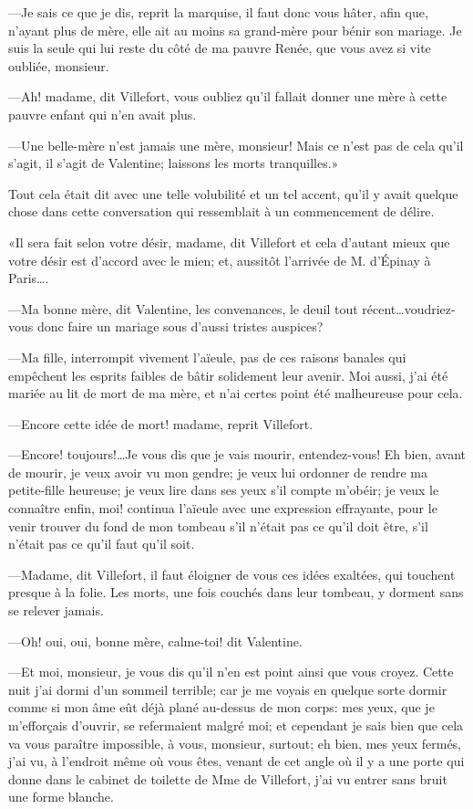 —Je sais ce que je dis, reprit la marquise, il faut donc vous hâter, afin que, n'ayant plus de mère, elle ait au moins sa grand-mère pour bénir son mariage. Je suis la seule qui lui reste du côté de ma pauvre Renée, que vous avez si vite oubliée, monsieur. 

—Ah! madame, dit Villefort, vous oubliez qu'il fallait donner une mère à cette pauvre enfant qui n'en avait plus. 

—Une belle-mère n'est jamais une mère, monsieur! Mais ce n'est pas de cela qu'il s'agit, il s'agit de Valentine; laissons les morts tranquilles.» 

Tout cela était dit avec une telle volubilité et un tel accent, qu'il y avait quelque chose dans cette conversation qui ressemblait à un commencement de délire. 

«Il sera fait selon votre désir, madame, dit Villefort et cela d'autant mieux que votre désir est d'accord avec le mien; et, aussitôt l'arrivée de M. d'Épinay à Paris\dots. 

—Ma bonne mère, dit Valentine, les convenances, le deuil tout récent\dots voudriez-vous donc faire un mariage sous d'aussi tristes auspices? 

—Ma fille, interrompit vivement l'aïeule, pas de ces raisons banales qui empêchent les esprits faibles de bâtir solidement leur avenir. Moi aussi, j'ai été mariée au lit de mort de ma mère, et n'ai certes point été malheureuse pour cela. 

—Encore cette idée de mort! madame, reprit Villefort. 

—Encore! toujours!\dots Je vous dis que je vais mourir, entendez-vous! Eh bien, avant de mourir, je veux avoir vu mon gendre; je veux lui ordonner de rendre ma petite-fille heureuse; je veux lire dans ses yeux s'il compte m'obéir; je veux le connaître enfin, moi! continua l'aïeule avec une expression effrayante, pour le venir trouver du fond de mon tombeau s'il n'était pas ce qu'il doit être, s'il n'était pas ce qu'il faut qu'il soit. 

—Madame, dit Villefort, il faut éloigner de vous ces idées exaltées, qui touchent presque à la folie. Les morts, une fois couchés dans leur tombeau, y dorment sans se relever jamais. 

—Oh! oui, oui, bonne mère, calme-toi! dit Valentine. 

—Et moi, monsieur, je vous dis qu'il n'en est point ainsi que vous croyez. Cette nuit j'ai dormi d'un sommeil terrible; car je me voyais en quelque sorte dormir comme si mon âme eût déjà plané au-dessus de mon corps: mes yeux, que je m'efforçais d'ouvrir, se refermaient malgré moi; et cependant je sais bien que cela va vous paraître impossible, à vous, monsieur, surtout; eh bien, mes yeux fermés, j'ai vu, à l'endroit même où vous êtes, venant de cet angle où il y a une porte qui donne dans le cabinet de toilette de Mme de Villefort, j'ai vu entrer sans bruit une forme blanche. 

